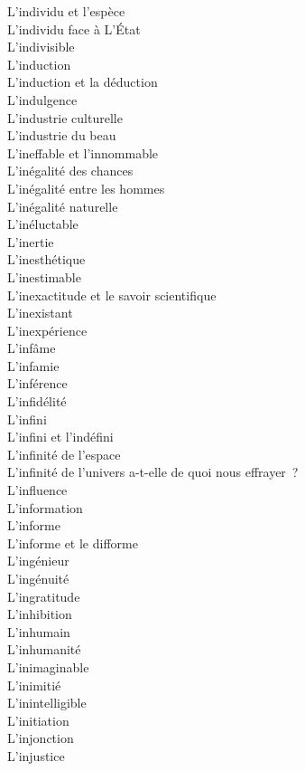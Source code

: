 \documentclass[a4paper,12pt]{article}
\begin{document}
L'individu et l'espèce \\
L'individu face à L'État \\
L'indivisible \\
L'induction \\
L'induction et la déduction \\
L'indulgence \\
L'industrie culturelle \\
L'industrie du beau \\
L'ineffable et l'innommable \\
L'inégalité des chances \\
L'inégalité entre les hommes \\
L'inégalité naturelle \\
L'inéluctable \\
L'inertie \\
L'inesthétique \\
L'inestimable \\
L'inexactitude et le savoir scientifique \\
L'inexistant \\
L'inexpérience \\
L'infâme \\
L'infamie \\
L'inférence \\
L'infidélité \\
L'infini \\
L'infini et l'indéfini \\
L'infinité de l'espace \\
L'infinité de l'univers a-t-elle de quoi nous effrayer ? \\
L'influence \\
L'information \\
L'informe \\
L'informe et le difforme \\
L'ingénieur \\
L'ingénuité \\
L'ingratitude \\
L'inhibition \\
L'inhumain \\
L'inhumanité \\
L'inimaginable \\
L'inimitié \\
L'inintelligible \\
L'initiation \\
L'injonction \\
L'injustice \\
\end{document}
